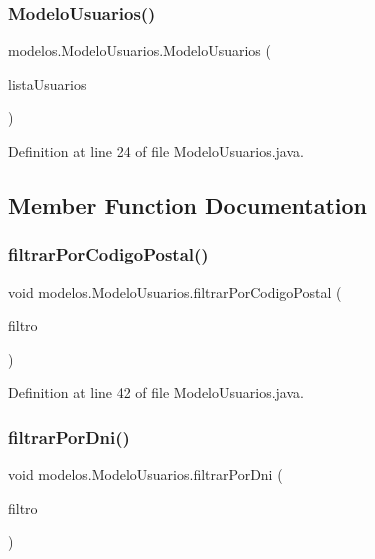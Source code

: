 \subsubsection{\texorpdfstring{Modelo\+Usuarios()}{ModeloUsuarios()}}
{\footnotesize\ttfamily modelos.\+Modelo\+Usuarios.\+Modelo\+Usuarios (\begin{DoxyParamCaption}\item[{Array\+List$<$ \mbox{\hyperlink{classobjetos_1_1_usuario}{Usuario}} $>$}]{lista\+Usuarios }\end{DoxyParamCaption})}



Definition at line 24 of file Modelo\+Usuarios.\+java.



\subsection{Member Function Documentation}
\mbox{\label{classmodelos_1_1_modelo_usuarios_a32302d42fef716e596f45c6ed27a3641}} 
\subsubsection{\texorpdfstring{filtrar\+Por\+Codigo\+Postal()}{filtrarPorCodigoPostal()}}
{\footnotesize\ttfamily void modelos.\+Modelo\+Usuarios.\+filtrar\+Por\+Codigo\+Postal (\begin{DoxyParamCaption}\item[{String}]{filtro }\end{DoxyParamCaption})}



Definition at line 42 of file Modelo\+Usuarios.\+java.

\mbox{\label{classmodelos_1_1_modelo_usuarios_a65777b1abda04e3dd05762d1e5a4cc1d}} 
\subsubsection{\texorpdfstring{filtrar\+Por\+Dni()}{filtrarPorDni()}}
{\footnotesize\ttfamily void modelos.\+Modelo\+Usuarios.\+filtrar\+Por\+Dni (\begin{DoxyParamCaption}\item[{String}]{filtro }\end{DoxyParamCaption})}



